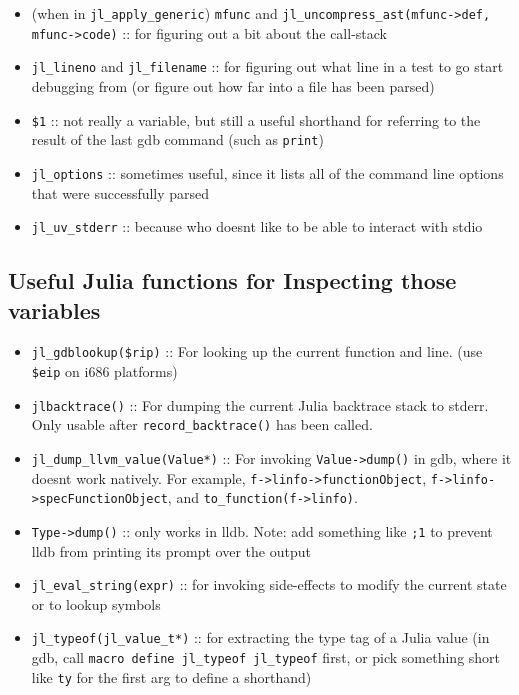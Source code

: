 \begin{itemize}
\item (when in \texttt{jl\_apply\_generic}) \texttt{mfunc} and \texttt{jl\_uncompress\_ast(mfunc->def, mfunc->code)} :: for figuring out a bit about the call-stack


\item \texttt{jl\_lineno} and \texttt{jl\_filename} :: for figuring out what line in a test to go start debugging from (or figure out how far into a file has been parsed)


\item \texttt{\$1} :: not really a variable, but still a useful shorthand for referring to the result of the last gdb command (such as \texttt{print})


\item \texttt{jl\_options} :: sometimes useful, since it lists all of the command line options that were successfully parsed


\item \texttt{jl\_uv\_stderr} :: because who doesn{\textquotesingle}t like to be able to interact with stdio

\end{itemize}


\hypertarget{7178558395386377758}{}


\subsection{Useful Julia functions for Inspecting those variables}



\begin{itemize}
\item \texttt{jl\_gdblookup(\$rip)} :: For looking up the current function and line. (use \texttt{\$eip} on i686 platforms)


\item \texttt{jlbacktrace()} :: For dumping the current Julia backtrace stack to stderr. Only usable after \texttt{record\_backtrace()} has been called.


\item \texttt{jl\_dump\_llvm\_value(Value*)} :: For invoking \texttt{Value->dump()} in gdb, where it doesn{\textquotesingle}t work natively. For example, \texttt{f->linfo->functionObject}, \texttt{f->linfo->specFunctionObject}, and \texttt{to\_function(f->linfo)}.


\item \texttt{Type->dump()} :: only works in lldb. Note: add something like \texttt{;1} to prevent lldb from printing its prompt over the output


\item \texttt{jl\_eval\_string({\textquotedbl}expr{\textquotedbl})} :: for invoking side-effects to modify the current state or to lookup symbols


\item \texttt{jl\_typeof(jl\_value\_t*)} :: for extracting the type tag of a Julia value (in gdb, call \texttt{macro define jl\_typeof jl\_typeof} first, or pick something short like \texttt{ty} for the first arg to define a shorthand)

\end{itemize}


